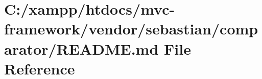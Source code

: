 \hypertarget{vendor_2sebastian_2comparator_2_r_e_a_d_m_e_8md}{}\section{C\+:/xampp/htdocs/mvc-\/framework/vendor/sebastian/comparator/\+R\+E\+A\+D\+ME.md File Reference}
\label{vendor_2sebastian_2comparator_2_r_e_a_d_m_e_8md}
